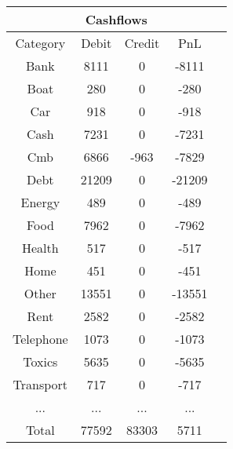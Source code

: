 \begin{longtable}{|c|c|c|c|c|}
\hline
\multicolumn{5}{|c|}{Cashflows} \\
\hline
Category & Debit & Credit & PnL \\
\hline
Bank & 8111 & 0 & -8111\\
\hline
Boat & 280 & 0 & -280\\
\hline
Car & 918 & 0 & -918\\
\hline
Cash & 7231 & 0 & -7231\\
\hline
Cmb & 6866 & -963 & -7829\\
\hline
Debt & 21209 & 0 & -21209\\
\hline
Energy & 489 & 0 & -489\\
\hline
Food & 7962 & 0 & -7962\\
\hline
Health & 517 & 0 & -517\\
\hline
Home & 451 & 0 & -451\\
\hline
Other & 13551 & 0 & -13551\\
\hline
Rent & 2582 & 0 & -2582\\
\hline
Telephone & 1073 & 0 & -1073\\
\hline
Toxics & 5635 & 0 & -5635\\
\hline
Transport & 717 & 0 & -717\\
\hline
 ... & ... & ... & ...\\
\hline
 Total & 77592 & 83303 & 5711 \\
\hline
\end{longtable}
